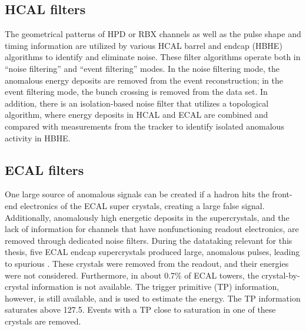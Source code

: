 \subsection{HCAL filters}
The geometrical patterns of HPD or RBX channels as well as the pulse shape and timing information are utilized by various HCAL barrel and endcap (HBHE) algorithms to identify and eliminate noise. 
These filter algorithms operate both in ``noise filtering'' and ``event filtering'' modes.
In the noise filtering mode, the anomalous energy deposits are removed from the event reconstruction; in the event filtering mode, the bunch crossing is removed from the data set. 
In addition, there is an isolation-based noise filter that utilizes a topological algorithm, where energy deposits in HCAL and ECAL are combined
and compared with measurements from the tracker to identify isolated anomalous activity in HBHE. 
\subsection{ECAL filters}
One large source of anomalous \ptmiss signals can be created if a hadron hits the front-end electronics of the ECAL super crystals, creating a large false signal.  
Additionally, anomalously high energetic deposits in the supercrystals, and the lack of information for channels that have nonfunctioning readout electronics, are removed through dedicated noise filters.
During the datataking relevant for this thesis, five ECAL endcap supercrystals produced large, anomalous pulses, leading to spurious \ptmiss. 
These crystals were removed from the readout, and their energies were not considered.
Furthermore, in about 0.7\% of ECAL towers, the crystal-by-crystal information is not available. 
The trigger primitive (TP) information, however, is still available, and is used to estimate the energy. 
The TP information saturates above 127.5\GeV. Events with a TP close to saturation in one of these crystals are removed.
